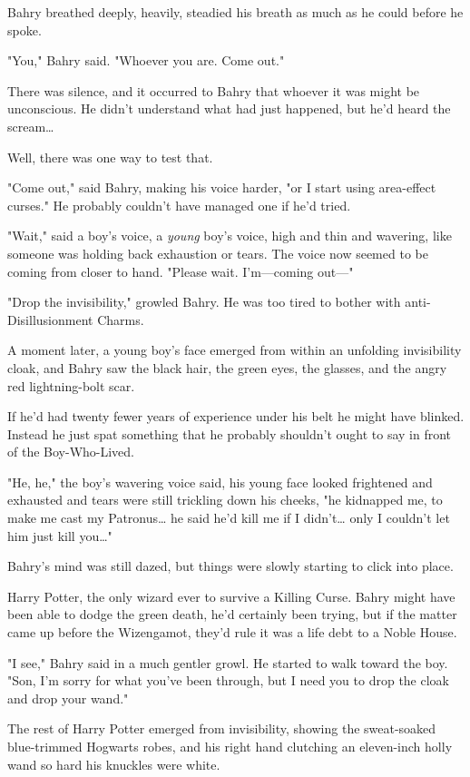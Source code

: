Bahry breathed deeply, heavily, steadied his breath as much as he could before 
he spoke.

"You," Bahry said. "Whoever you are. Come out."

There was silence, and it occurred to Bahry that whoever it was might be 
unconscious. He didn't understand what had just happened, but he'd heard the 
scream{\ldots}

Well, there was one way to test that.

"Come out," said Bahry, making his voice harder, "or I start using area-effect 
curses." He probably couldn't have managed one if he'd tried.

"Wait," said a boy's voice, a \emph{young} boy's voice, high and thin and 
wavering, like someone was holding back exhaustion or tears. The voice now 
seemed to be coming from closer to hand. "Please wait. I'm---coming out---"

"Drop the invisibility," growled Bahry. He was too tired to bother with 
anti-Disillusionment Charms.

A moment later, a young boy's face emerged from within an unfolding 
invisibility cloak, and Bahry saw the black hair, the green eyes, the glasses, 
and the angry red lightning-bolt scar.

If he'd had twenty fewer years of experience under his belt he might have 
blinked. Instead he just spat something that he probably shouldn't ought to say 
in front of the Boy-Who-Lived.

"He, he," the boy's wavering voice said, his young face looked frightened and 
exhausted and tears were still trickling down his cheeks, "he kidnapped me, to 
make me cast my Patronus{\ldots} he said he'd kill me if I didn't{\ldots} only 
I couldn't let him just kill you{\ldots}"

Bahry's mind was still dazed, but things were slowly starting to click into 
place.

Harry Potter, the only wizard ever to survive a Killing Curse. Bahry might have 
been able to dodge the green death, he'd certainly been trying, but if the 
matter came up before the Wizengamot, they'd rule it was a life debt to a Noble 
House.

"I see," Bahry said in a much gentler growl. He started to walk toward the boy. 
"Son, I'm sorry for what you've been through, but I need you to drop the cloak 
and drop your wand."

The rest of Harry Potter emerged from invisibility, showing the sweat-soaked 
blue-trimmed Hogwarts robes, and his right hand clutching an eleven-inch holly 
wand so hard his knuckles were white.

